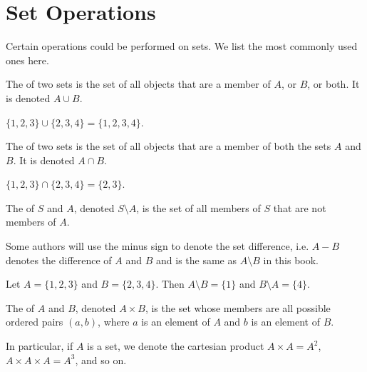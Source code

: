 \newpage

\section{Set Operations}
Certain operations could be performed on sets. We list the most commonly used ones here.
\begin{definition}
    The  of two sets is the set of all objects that are a member of $A$, or $B$, or both. It is denoted $A \cup B$.
\end{definition}

\begin{example}
    $\{1, 2, 3\} \cup \{2, 3, 4\} = \{1, 2, 3, 4\}$.
\end{example}

\begin{definition}
    The  of two sets is the set of all objects that are a member of both the sets $A$ and $B$. It is denoted $A \cap B$.
\end{definition}

\begin{example}
    $\{1, 2, 3\} \cap \{2, 3, 4\} = \{2, 3\}$.
\end{example}

\begin{definition}
    The  of $S$ and $A$, denoted $S \setminus A$, is the set of all members of $S$ that are not members of $A$.
\end{definition}
\begin{remark}
    Some authors will use the minus sign to denote the set difference, i.e. $A - B$ denotes the difference of $A$ and $B$ and is the same as $A \setminus B$ in this book.
\end{remark}

\begin{example}
    Let $A = \{1, 2, 3\}$ and $B = \{2, 3, 4\}$. Then $A \setminus B = \{1\}$ and $B \setminus A = \{4\}$.
\end{example}

\begin{definition}
    The  of $A$ and $B$, denoted $A \times B$, is the set whose members are all possible ordered pairs $(a, b)$, where $a$ is an element of $A$ and $b$ is an element of $B$.
\end{definition}
\begin{remark}
    In particular, if $A$ is a set, we denote the cartesian product $A \times A = A^2$, $A\times A \times A = A^3$, and so on.
\end{remark}

